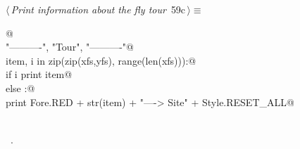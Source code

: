 \documentclass[11.5pt]{report}
\begin{document}
\vspace{-0.8cm} \newchunk
\begin{flushleft} \small\label{scrap89}\raggedright\small
{} $\langle\,${\itshape Print information about the fly tour}\nobreak\ {\footnotesize {59c}}$\,\rangle\equiv$
\vspace{-1ex}
\begin{list}{}{} \item
\mbox{}\verb@   @\\
\mbox{}\verb@print "\n----------", "\nFly Tour", "\n----------"@\\
\mbox{}\verb@for item, i in zip(zip(xfs,yfs), range(len(xfs))):@\\
\mbox{}\verb@   if i%2 == 0:@\\
\mbox{}\verb@       print item@\\
\mbox{}\verb@   else :@\\
\mbox{}\verb@       print Fore.RED + str(item) + "----> Site" +  Style.RESET_ALL@\\
\mbox{}\verb@@\\
\mbox{}\verb@@{\NWsep}
\end{list}
\vspace{-1.5ex}
\footnotesize
\begin{list}{}{\setlength{\itemsep}{-\parsep}\setlength{\itemindent}{-\leftmargin}}
\item \NWtxtMacroRefIn\ .

\item{}
\end{list}
\vspace{4ex}
\end{flushleft}
\end{document}

